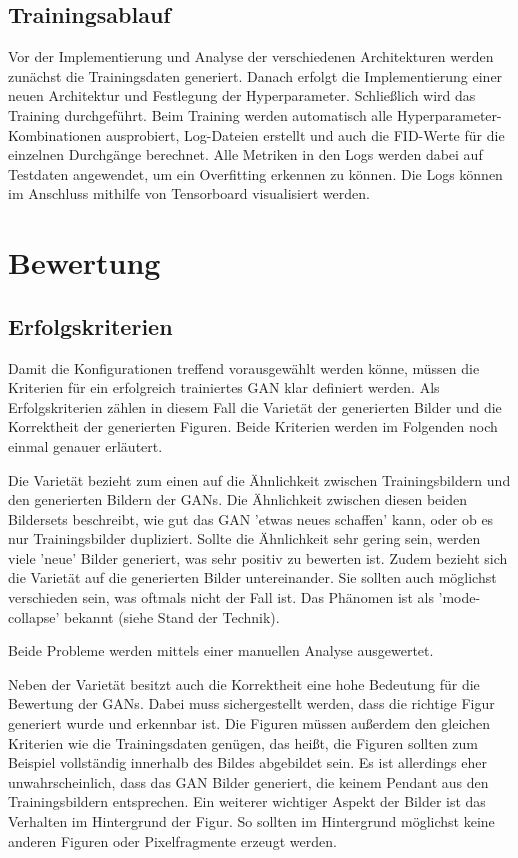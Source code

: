 \subsection{Trainingsablauf}
Vor der Implementierung und Analyse der verschiedenen Architekturen werden zunächst die Trainingsdaten generiert.
Danach erfolgt die Implementierung einer neuen Architektur und Festlegung der Hyperparameter.
Schließlich wird das Training durchgeführt.
Beim Training werden automatisch alle Hyperparameter-Kombinationen ausprobiert, Log-Dateien erstellt und auch die FID-Werte für die einzelnen Durchgänge berechnet.
Alle Metriken in den Logs werden dabei auf Testdaten angewendet, um ein Overfitting erkennen zu können.
Die Logs können im Anschluss mithilfe von Tensorboard visualisiert werden.

\section{Bewertung}
\subsection{Erfolgskriterien}
Damit die Konfigurationen treffend vorausgewählt werden könne, müssen die Kriterien für ein erfolgreich trainiertes GAN klar definiert werden.
Als Erfolgskriterien zählen in diesem Fall die Varietät der generierten Bilder und die Korrektheit der generierten Figuren.
Beide Kriterien werden im Folgenden noch einmal genauer erläutert.

Die Varietät bezieht zum einen auf die Ähnlichkeit zwischen Trainingsbildern und den generierten Bildern der GANs.
Die Ähnlichkeit zwischen diesen beiden Bildersets beschreibt, wie gut das GAN 'etwas neues schaffen' kann, oder ob es nur Trainingsbilder dupliziert.
Sollte die Ähnlichkeit sehr gering sein, werden viele 'neue' Bilder generiert, was sehr positiv zu bewerten ist.
Zudem bezieht sich die Varietät auf die generierten Bilder untereinander.
Sie sollten auch möglichst verschieden sein, was oftmals nicht der Fall ist.
Das Phänomen ist als 'mode-collapse' bekannt (siehe Stand der Technik). %

Beide Probleme werden mittels einer manuellen Analyse ausgewertet.

Neben der Varietät besitzt auch die Korrektheit eine hohe Bedeutung für die Bewertung der GANs.
Dabei muss sichergestellt werden, dass die richtige Figur generiert wurde und erkennbar ist.
Die Figuren müssen außerdem den gleichen Kriterien wie die Trainingsdaten genügen, das heißt, die Figuren sollten zum Beispiel vollständig innerhalb des Bildes abgebildet sein.
Es ist allerdings eher unwahrscheinlich, dass das GAN Bilder generiert, die keinem Pendant aus den Trainingsbildern entsprechen.
Ein weiterer wichtiger Aspekt der Bilder ist das Verhalten im Hintergrund der Figur.
So sollten im Hintergrund möglichst keine anderen Figuren oder Pixelfragmente erzeugt werden.


